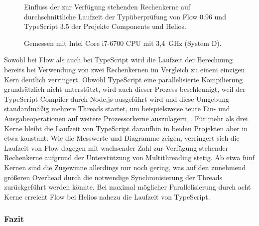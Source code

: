 \tablespace


\begin{figure}[p]
  \centering

  

  \vspace{.5\baselineskip}

  
  \vspace{.5\baselineskip}
  \caption[Einfluss der zur Verfügung stehenden Rechenkerne auf durchschnittliche Laufzeit der Typüberprüfung von Flow und TypeScript]{
    Einfluss der zur Verfügung stehenden Rechenkerne auf durchschnittliche Laufzeit der Typüberprüfung von Flow 0.96 und TypeScript 3.5 der Projekte Components und Helios.
  }

  \vspace{0.75\baselineskip}
  \caption*{
    \small
    Gemessen mit Intel Core i7-6700 CPU mit 3,4~GHz (System D).
  }

  \label{fig:plot-cores}
\end{figure}

Sowohl bei Flow als auch bei TypeScript wird die Laufzeit der Berechnung bereits bei Verwendung von zwei Rechenkernen im Vergleich zu einem einzigen Kern deutlich verringert. Obwohl TypeScript eine parallelisierte Kompilierung grundsätzlich nicht unterstützt, wird auch dieser Prozess beschleunigt, weil der TypeScript-Compiler durch Node.js ausgeführt wird und diese Umgebung standardmäßig mehrere Threads startet, um beispielsweise teure Ein- und Ausgabeoperationen auf weitere Prozessorkerne auszulagern~\autocite{NODE:THREADS}. Für mehr als drei Kerne bleibt die Laufzeit von TypeScript daraufhin in beiden Projekten aber in etwa konstant. Wie die Messwerte und Diagramme zeigen, verringert sich die Laufzeit von Flow dagegen mit wachsender Zahl zur Verfügung stehender Rechenkerne aufgrund der Unterstützung von Multithreading stetig. Ab etwa fünf Kernen sind die Zugewinne allerdings nur noch gering, was auf den zunehmend größeren Overhead durch die notwendige Synchronisierung der Threads zurückgeführt werden könnte. Bei maximal möglicher Parallelisierung durch acht Kerne erreicht Flow bei Helios nahezu die Laufzeit von TypeScript.

\subsubsection{Fazit}

